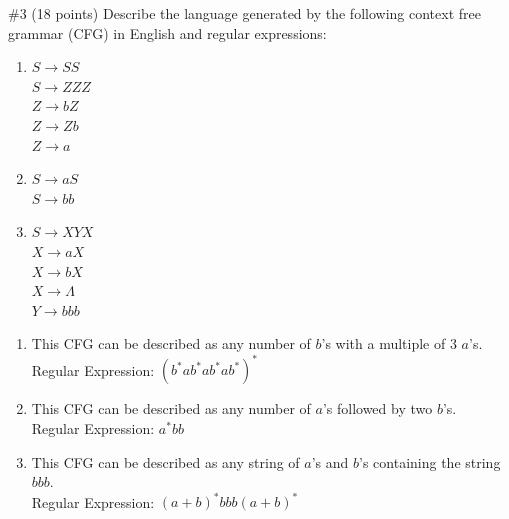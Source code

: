 \begin{problem}{\#3 (18 points)}
    Describe the language generated by the following context free grammar (CFG) in English and regular expressions:
    \begin{enumerate}[label=\alph*)]
        \item $S \to SS$\\
        $S \to ZZZ$\\
        $Z \to bZ$\\
        $Z \to Zb$\\
        $Z \to a$
        \item $S \to aS$\\
        $S \to bb$
        \item $S \to XYX$\\
        $X \to aX$\\
        $X \to bX$\\
        $X \to \Lambda$\\
        $Y \to bbb$
    \end{enumerate}
\end{problem}
\begin{solution}
    \begin{enumerate}[label=\alph*)]
        \item This CFG can be described as any number of $b$'s with a multiple of 3 $a$'s.\\
        Regular Expression: $\left(b^*ab^*ab^*ab^*\right)^*$ 
        \item This CFG can be described as any number of $a$'s followed by two $b$'s.\\
        Regular Expression: $a^*bb$
        \item This CFG can be described as any string of $a$'s and $b$'s containing the string $bbb$.\\
        Regular Expression: $(a+b)^*bbb(a+b)^*$
    \end{enumerate}
\end{solution}

